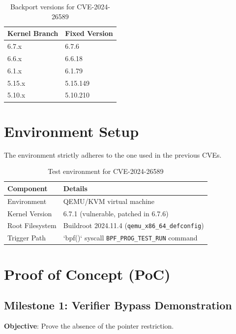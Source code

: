 \begin{table}[H]
\centering
\begin{tabular}{@{}ll@{}}
\toprule
\textbf{Kernel Branch} & \textbf{Fixed Version} \\
\midrule
6.7.x & 6.7.6 \\
6.6.x & 6.6.18 \\
6.1.x & 6.1.79 \\
5.15.x & 5.15.149 \\
5.10.x & 5.10.210 \\
\bottomrule
\end{tabular}
\caption{Backport versions for CVE-2024-26589}
\end{table}

\section{Environment Setup}

The environment strictly adheres to the one used in the previous CVEs.

\begin{table}[H]
\centering
\begin{tabular}{@{}ll@{}}
\toprule
\textbf{Component} & \textbf{Details} \\
\midrule
Environment & QEMU/KVM virtual machine \\
Kernel Version & 6.7.1 (vulnerable, patched in 6.7.6) \\
Root Filesystem & Buildroot 2024.11.4 (\texttt{qemu\_x86\_64\_defconfig}) \\
Trigger Path & `bpf()` syscall \texttt{BPF\_PROG\_TEST\_RUN} command \\
\bottomrule
\end{tabular}
\caption{Test environment for CVE-2024-26589}
\end{table}

\section{Proof of Concept (PoC)}

\subsection{Milestone 1: Verifier Bypass Demonstration}

\textbf{Objective}: Prove the absence of the pointer restriction.

